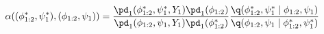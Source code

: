 \begin{equation}
  \alpha((\phi_{1:2}^{*}, \psi_{1}^{*}), (\phi_{1:2}, \psi_{1})) = 
  \frac {
    \pd_{1}(\phi_{1:2}^{*}, \psi_{1}^{*}, Y_{1})
    \pd_{1}(\phi_{1:2})
  } {
    \pd_{1}(\phi_{1:2}, \psi_{1}, Y_{1})
    \pd_{1}(\phi_{1:2}^{*})
  }
  \frac {
    \q(\phi_{1:2}^{*}, \psi_{1}^{*} \mid \phi_{1:2}, \psi_{1})
  } {
    \q(\phi_{1:2}, \psi_{1} \mid \phi_{1:2}^{*}, \psi_{1}^{*})
  }
  \label{eqn:stage-one-acceptance-probability}
\end{equation}